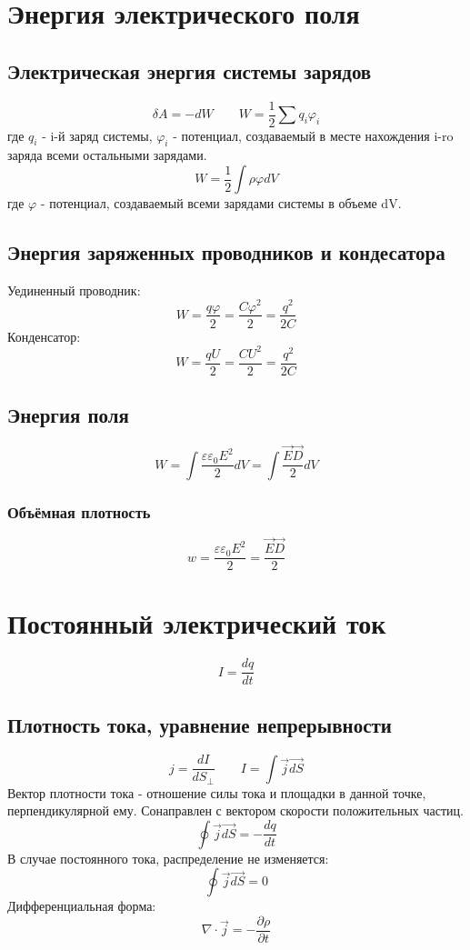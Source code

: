\documentclass{article}
\begin{document}
\section{Энергия электрического поля}

\subsection{Электрическая энергия системы зарядов}
\[\delta A=-dW \qquad W=\frac{1}{2}\sum q_{i}\varphi_{i}\]
где $q_{i}$ - i-й заряд системы, $\varphi_{i}$ - потенциал, создаваемый в месте нахождения i-ro заряда всеми остальными зарядами.
\[W=\frac{1}{2}\int\rho\varphi dV\]
где $\varphi$ - потенциал, создаваемый всеми зарядами системы в объеме dV.

\subsection{Энергия заряженных проводников и кондесатора}
Уединенный проводник:
\[W=\frac{q\varphi}{2}=\frac{C\varphi^2}{2}=\frac{q^2}{2C}\]
Конденсатор:
\[W=\frac{qU}{2}=\frac{CU^2}{2}=\frac{q^2}{2C}\]

\subsection{Энергия поля}
\[W=\int\frac{\varepsilon\varepsilon_{0} E^2}{2}dV=\int\frac{\vec{E}\vec{D}}{2}dV\]
\subsubsection{Объёмная плотность}
\[w=\frac{\varepsilon\varepsilon_{0} E^2}{2}=\frac{\vec{E}\vec{D}}{2}\]


\section{Постоянный электрический ток}
\[I=\frac{dq}{dt}\]

\subsection{Плотность тока, уравнение непрерывности}
\[j=\frac{dI}{dS_{\perp}} \qquad I=\int\vec{j}\vec{dS}\]
Вектор плотности тока - отношение силы тока и площадки в данной точке, перпендикулярной ему. Сонаправлен с вектором скорости положительных частиц.
\[\oint\vec{j}\vec{dS}=-\frac{dq}{dt}\]
В случае постоянного тока, распределение не изменяется:
\[\oint\vec{j}\vec{dS}=0\]
Дифференциальная форма:
\[\nabla\cdot\vec{j}=-\frac{\partial\rho}{\partial t}\]
\end{document}
